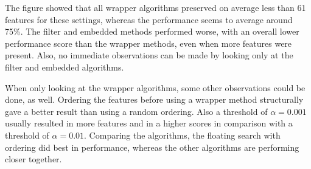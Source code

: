 \documentclass[10pt,a4paper]{report}
\begin{document}
	The figure showed that all wrapper algorithms preserved on average less than 61 features for these settings, whereas the performance seems to average around 75\%. The filter and embedded methods performed worse, with an overall lower performance score than the wrapper methods, even when more features were present. Also, no immediate observations can be made by looking only at the filter and embedded algorithms.
	
	When only looking at the wrapper algorithms, some other observations could be done, as well. Ordering the features before using a wrapper method structurally gave a better result than using a random ordering. Also a threshold of $\alpha = 0.001$ usually resulted in more features and in a higher scores in comparison with a threshold of $\alpha = 0.01$. Comparing the algorithms, the floating search with ordering did best in performance, whereas the other algorithms are performing closer together.
\end{document}
